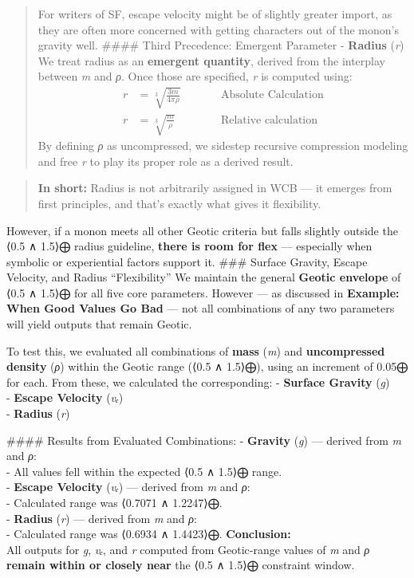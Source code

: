 \documentclass[
  letterpaper,
]{book}
\begin{document}
\begin{quote}
For writers of SF, escape velocity might be of slightly greater import,
as they are often more concerned with getting characters out of the
monon's gravity well. \#\#\#\# Third Precedence: Emergent Parameter -
\textbf{Radius} (\emph{r}) We treat radius as an \textbf{emergent
quantity}, derived from the interplay between \emph{m} and \emph{ρ}.
Once those are specified, \emph{r} is computed using: \[
\begin{align}
r &= \sqrt[3]{\frac{3 m}{4 \pi \rho}} &&\qquad \text{Absolute Calculation} \\
r &= \sqrt[3]{\frac{m}{\rho}} &&\qquad \text{Relative calculation}
\end{align}
\] By defining \emph{ρ} as uncompressed, we sidestep recursive
compression modeling and free \emph{r} to play its proper role as a
derived result.
\end{quote}

\begin{quote}
\textbf{In short:} Radius is not arbitrarily assigned in WCB --- it
emerges from first principles, and that's exactly what gives it
flexibility.
\end{quote}

However, if a monon meets all other Geotic criteria but falls slightly
outside the ⟨0.5 ∧ 1.5⟩⨁ radius guideline, \textbf{there is room for
flex} --- especially when symbolic or experiential factors support it.
\#\#\# Surface Gravity, Escape Velocity, and Radius ``Flexibility'' We
maintain the general \textbf{Geotic envelope} of ⟨0.5 ∧ 1.5⟩⨁ for all
five core parameters. However --- as discussed in \textbf{Example: When
Good Values Go Bad} --- not all combinations of any two parameters will
yield outputs that remain Geotic.

To test this, we evaluated all combinations of \textbf{mass} (\emph{m})
and \textbf{uncompressed density} (\emph{ρ}) within the Geotic range
(⟨0.5 ∧ 1.5⟩⨁), using an increment of 0.05⨁ for each. From these, we
calculated the corresponding: - \textbf{Surface Gravity} (\emph{g})\\
- \textbf{Escape Velocity} (\emph{vₑ})\\
- \textbf{Radius} (\emph{r})

\#\#\#\# Results from Evaluated Combinations: - \textbf{Gravity}
(\emph{g}) --- derived from \emph{m} and \emph{ρ}:\\
- All values fell within the expected ⟨0.5 ∧ 1.5⟩⨁ range.\\
- \textbf{Escape Velocity} (\emph{vₑ}) --- derived from \emph{m} and
\emph{ρ}:\\
- Calculated range was ⟨0.7071 ∧ 1.2247⟩⨁.\\
- \textbf{Radius} (\emph{r}) --- derived from \emph{m} and \emph{ρ}:\\
- Calculated range was ⟨0.6934 ∧ 1.4423⟩⨁. \textbf{Conclusion:}\\
All outputs for \emph{g}, \emph{vₑ}, and \emph{r} computed from
Geotic-range values of \emph{m} and \emph{ρ} \textbf{remain within or
closely near} the ⟨0.5 ∧ 1.5⟩⨁ constraint window.
\end{document}
